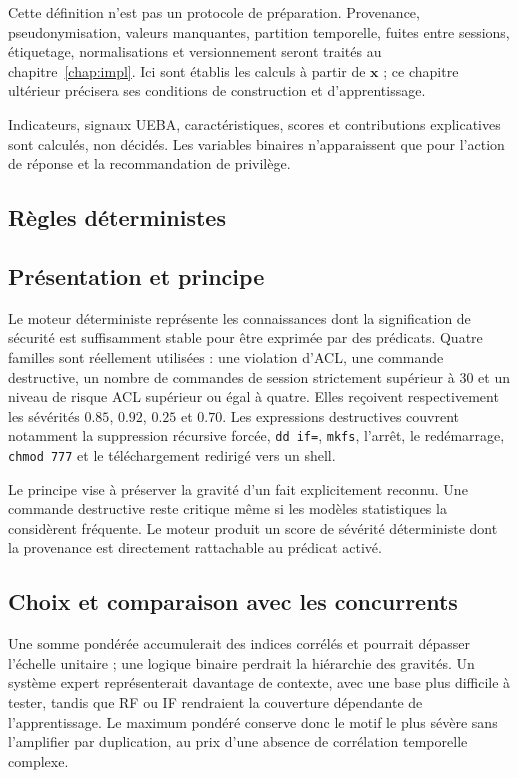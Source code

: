 \documentclass[11pt,a4paper,oneside]{report}
\theoremstyle{definition}
\theoremstyle{plain}
\begin{document}
Cette définition n'est pas un protocole de préparation. Provenance, pseudonymisation, valeurs manquantes, partition temporelle, fuites entre sessions, étiquetage, normalisations et versionnement seront traités au chapitre~\ref{chap:impl}. Ici sont établis les calculs à partir de $\mathbf{x}$ ; ce chapitre ultérieur précisera ses conditions de construction et d'apprentissage.

Indicateurs, signaux UEBA, caractéristiques, scores et contributions explicatives sont calculés, non décidés. Les variables binaires n'apparaissent que pour l'action de réponse et la recommandation de privilège.

\subsection{Règles déterministes}
\label{sec:ai-ro-rules}

\subsection*{Présentation et principe}

Le moteur déterministe représente les connaissances dont la signification de sécurité est suffisamment stable pour être exprimée par des prédicats. Quatre familles sont réellement utilisées : une violation d'ACL, une commande destructive, un nombre de commandes de session strictement supérieur à 30 et un niveau de risque ACL supérieur ou égal à quatre. Elles reçoivent respectivement les sévérités $0.85$, $0.92$, $0.25$ et $0.70$. Les expressions destructives couvrent notamment la suppression récursive forcée, \texttt{dd if=}, \texttt{mkfs}, l'arrêt, le redémarrage, \texttt{chmod 777} et le téléchargement redirigé vers un shell.

Le principe vise à préserver la gravité d'un fait explicitement reconnu. Une
commande destructive reste critique même si les modèles statistiques la
considèrent fréquente. Le moteur produit un score de sévérité déterministe dont
la provenance est directement rattachable au prédicat activé.

\subsection*{Choix et comparaison avec les concurrents}

Une somme pondérée accumulerait des indices corrélés et pourrait dépasser l'échelle unitaire ; une logique binaire perdrait la hiérarchie des gravités. Un système expert représenterait davantage de contexte, avec une base plus difficile à tester, tandis que RF ou IF rendraient la couverture dépendante de l'apprentissage. Le maximum pondéré conserve donc le motif le plus sévère sans l'amplifier par duplication, au prix d'une absence de corrélation temporelle complexe.
\end{document}
